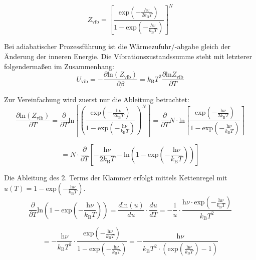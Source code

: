 \documentclass[a4paper,12pt,oneside,onecolum,final,openany]{report}
\begin{document}
\begin{equation}
Z_\mathrm{vib}= \left[\frac{\mathrm{exp}(-\frac{hv}{2k_\mathrm{B}T})}{1-\mathrm{exp}(-\frac{hv}{k_\mathrm{B}T})}\right]^N
\end{equation}

Bei adiabatischer Prozessführung ist die Wärmezufuhr/-abgabe gleich der Änderung der inneren Energie. Die Vibrationszustandssumme steht mit letzterer folgendermaßen im Zusammenhang:\\

\begin{equation} \label{herleiten}
U_\mathrm{vib}= - \frac{\partial \mathrm{ln}(Z_\mathrm{vib})}{\partial \beta} =k_\mathrm{B}T^2 \frac{\partial \mathrm{ln}Z_\mathrm{vib}}{\partial T} 
\end{equation}

Zur Vereinfachung wird zuerst nur die Ableitung betrachtet:\\
\begin{equation}
\frac{\partial \mathrm{ln}(Z_\mathrm{vib})}{\partial T}= 
\frac{\partial}{\partial T} \mathrm{ln} \left[ \left( \frac{\mathrm{exp}(-\frac{\mathrm{h}\nu}{2k_\mathrm{B}T})}{1-\mathrm{exp}(-\frac{\mathrm{h}\nu}{k_\mathrm{B}T})}\right)^N \right] 
= \frac{\partial}{\partial T} N\cdot \mathrm{ln} \left[ \frac{\mathrm{exp}(-\frac{\mathrm{h}\nu}{2k_\mathrm{B}T})}{1-\mathrm{exp}(-\frac{\mathrm{h}\nu}{k_\mathrm{B}T})} \right]
\end{equation}


\begin{equation} \label{AbleitungBeginn}
= N \cdot \frac{\partial}{\partial T} \left[-\frac{\mathrm{h} \nu}{2k_\mathrm{B} T}
- \mathrm{ln}\left( 1-\mathrm{exp}\left( -\frac{\mathrm{h}\nu}{k_\mathrm{B}T}\right)\right) \right] 
\end{equation}

Die Ableitung des 2. Terms der Klammer erfolgt mittels Kettenregel mit $u(T)= 1- \mathrm{exp}(-\frac{\mathrm{h}\nu}{k_\mathrm{B}T})$.\\

\begin{equation}
\frac{\partial}{\partial T} \mathrm{ln}\left(1-\mathrm{exp}\left(-\frac{\mathrm{h}\nu}{k_\mathrm{B}T}\right)\right)= \frac{d \mathrm{ln}(u)}{du} \cdot \frac{du}{dT}= -\frac{1}{u} \cdot \frac{\mathrm{h}\nu \cdot \mathrm{exp}(-\frac{\mathrm{h}\nu}{k_\mathrm{B}T})}{k_\mathrm{B}T^2}
\end{equation}

\begin{equation} \label{AblLetzterTerm}
=-\frac{\mathrm{h}\nu}{k_\mathrm{B}T^2} \cdot \frac{\mathrm{exp}(-\frac{\mathrm{h}\nu}{k_\mathrm{B}T})}{1-\mathrm{exp}(-\frac{\mathrm{h}\nu}{k_\mathrm{B}T})}= - \frac{\mathrm{h}\nu}{k_\mathrm{B}T^2  \cdot (\mathrm{exp}(\frac{\mathrm{h}\nu}{k_\mathrm{B}T})-1) }
\end{equation}
\end{document}
